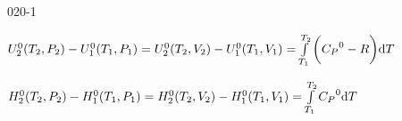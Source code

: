 \begin{mitframe}{020-1}
\begin{listone}
\begin{listtwo}
		\item $\intenergy_{2}^{\init}(\Temp_{2},\p_{2})-\intenergy_{1}^{\init}(\Temp_{1},\p_{1})=\intenergy_{2}^{\init}(\Temp_{2},\vol_{2})-\intenergy_{1}^{\init}(\Temp_{1},\vol_{1})=\int\limits_{\Temp_{1}}^{\Temp_{2}}\bigg({\cp}^{\init}-\gasconst\bigg)\mathrm{d}\Temp$
        
        \item $\enthalpy_{2}^{\init}(\Temp_{2},\p_{2})-\enthalpy_{1}^{\init}(\Temp_{1},\p_{1})=\enthalpy_{2}^{\init}(\Temp_{2},\vol_{2})-\enthalpy_{1}^{\init}(\Temp_{1},\vol_{1})=\int\limits_{\Temp_{1}}^{\Temp_{2}}{\cp}^{\init}\mathrm{d}\Temp$

	\end{listtwo}    
    
	\end{listone}			

\end{mitframe}